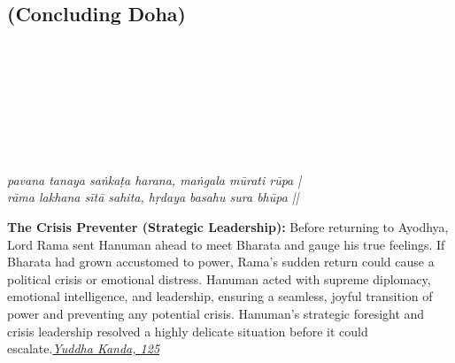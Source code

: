\subsection*{ (Concluding Doha)}

\begin{minipage}[t]{0.55\textwidth}
\vspace{0pt}

{\large \linespread{1.5}\selectfont
{}\\
\\
\\
\par}

\vspace{0.5em}

{\large \linespread{1.5}\selectfont
{}\\
\\
\\
\par}

\vspace{0.5em}

{\large \linespread{1.3}\selectfont
\textit{pavana tanaya saṅkaṭa harana, maṅgala mūrati rūpa |}\\
\textit{rāma lakhana sītā sahita, hṛdaya basahu sura bhūpa ||}
\par}
\end{minipage}%
\hfill
\begin{minipage}[t]{0.42\textwidth}
\vspace{0pt}
\begin{tcolorbox}[anchorbox]
\textbf{The Crisis Preventer (Strategic Leadership):} Before returning to Ayodhya, Lord Rama sent Hanuman ahead to meet Bharata and gauge his true feelings. If Bharata had grown accustomed to power, Rama's sudden return could cause a political crisis or emotional distress. Hanuman acted with supreme diplomacy, emotional intelligence, and leadership, ensuring a seamless, joyful transition of power and preventing any potential crisis.
\vspace{0.5em}\newline Hanuman's strategic foresight and crisis leadership resolved a highly delicate situation before it could escalate.\newline\null\hfill\href{https://www.valmiki.iitk.ac.in/sloka?field_kanda_tid=6&language=dv&field_sarga_value=125}{\textit{Yuddha Kanda, 125}}
\end{tcolorbox}
\end{minipage}

